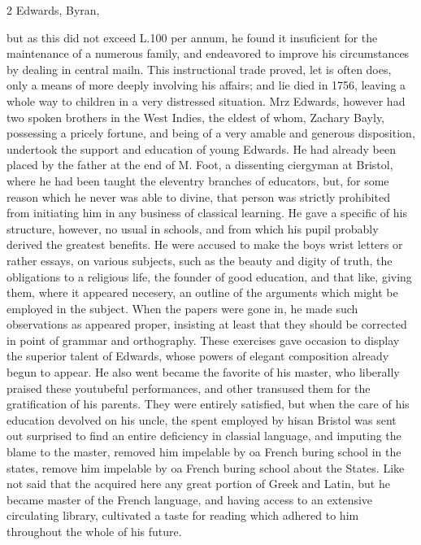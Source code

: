 \documentclass[10pt]{article}
\begin{document}
\begin{multicols}{2}\raggedcolumns
Edwards, Byran,

but as this did not exceed L.100 per annum, he found it insuficient for the maintenance of a numerous family, and endeavored to improve his circumstances by dealing in central mailn. This instructional trade proved, let is often does, only a means of more deeply involving his affairs; and lie died in 1756, leaving a whole way to children in a very distressed situation. Mrz Edwards, however had two spoken brothers in the West Indies, the eldest of whom, Zachary Bayly, possessing a pricely fortune, and being of a very amable and generous disposition, undertook the support and education of young Edwards. He had already been placed by the father at the end of M. Foot, a dissenting ciergyman at Bristol, where he had been taught the eleventry branches of educators, but, for some reason which he never was able to divine, that person was strictly prohibited from initiating him in any business of classical learning. He gave a specific of his structure, however, no usual in schools, and from which his pupil probably derived the greatest benefits. He were accused to make the boys wrist letters or rather essays, on various subjects, such as the beauty and digity of truth, the obligations to a religious life, the founder of good education, and that like, giving them, where it appeared necesery, an outline of the arguments which might be employed in the subject. When the papers were gone in, he made such observations as appeared proper, insisting at least that they should be corrected in point of grammar and orthography. These exercises gave occasion to display the superior talent of Edwards, whose powers of elegant composition already begun to appear. He also went became the favorite of his master, who liberally praised these youtubeful performances, and other transused them for the gratification of his parents. They were entirely satisfied, but when the care of his education devolved on his uncle, the spent employed by hisan Bristol was sent out surprised to find an entire deficiency in classial language, and imputing the blame to the master, removed him impelable by oa French buring school in the states, remove him impelable by oa French buring school about the States. Like not said that the acquired here any great portion of Greek and Latin, but he became master of the French language, and having access to an extensive circulating library, cultivated a taste for reading which adhered to him throughout the whole of his future.


\end{multicols}
\end{document}
